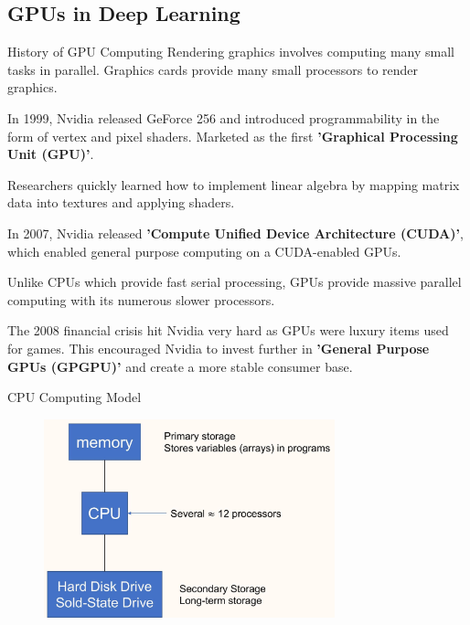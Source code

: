 \subsection{GPUs in Deep Learning}

\begin{frame}[allowframebreaks]

\begin{myconceptblock}{4.12}{History of GPU Computing}
    Rendering graphics involves computing many small tasks in parallel. Graphics cards provide many small processors to render graphics.

    In 1999, Nvidia released GeForce 256 and introduced programmability in the form of vertex and pixel shaders. Marketed as the first \textbf{'Graphical Processing Unit (GPU)'}.

    Researchers quickly learned how to implement linear algebra by mapping matrix data into textures and applying shaders.

    In 2007, Nvidia released \textbf{'Compute Unified Device Architecture (CUDA)'}, which enabled general purpose computing on a CUDA-enabled GPUs.

    Unlike CPUs which provide fast serial processing, GPUs provide massive parallel computing with its numerous slower processors.

    The 2008 financial crisis hit Nvidia very hard as GPUs were luxury items used for games. This encouraged Nvidia to invest further in \textbf{'General Purpose GPUs (GPGPU)'} and create a more stable consumer base.
\end{myconceptblock}

\end{frame}

\begin{frame}[allowframebreaks]

\begin{myconceptblock}{4.13}{CPU Computing Model}
    \begin{figure}[H]
        \centering
        \includegraphics[width=0.75\textwidth]{.././assets/4.6.jpg}
    \end{figure}
\end{myconceptblock}

\end{frame}

